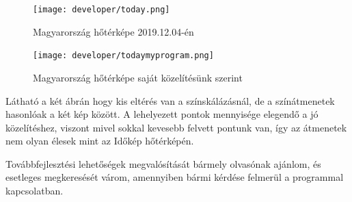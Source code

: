 			 	\begin{figure}[ht]
			 		\centering
			 		\texttt{[image: developer/today.png]}
			 		\caption{Magyarország hőtérképe 2019.12.04-én}
			 	\end{figure}
		 		\begin{figure}[hb]
		 			\centering
		 			\texttt{[image: developer/todaymyprogram.png]}
		 			\caption{Magyarország hőtérképe saját közelítésünk szerint}
		 		\end{figure}
	 			
	 			Látható a két ábrán hogy kis eltérés van a színskálázásnál, de a színátmenetek hasonlóak a két kép között. A lehelyezett pontok mennyisége elegendő a jó közelítéshez, viszont mivel sokkal kevesebb felvett pontunk van, így az átmenetek nem olyan élesek mint az Időkép hőtérképén.
	 			
	 			Továbbfejlesztési lehetőségek megvalósítását bármely olvasónak ajánlom, és esetleges megkeresését várom, amennyiben bármi kérdése felmerül a programmal kapcsolatban.
